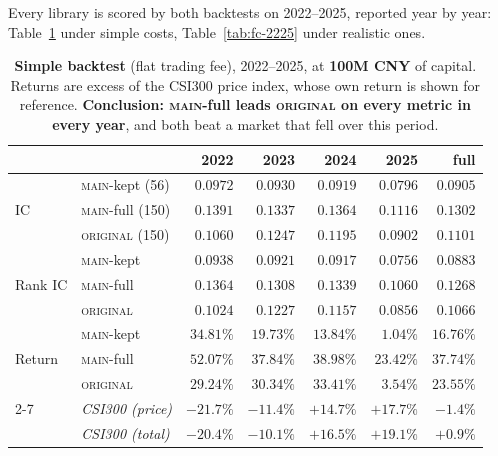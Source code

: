 \documentclass[11pt]{article}
\newcommand{\main}{\textsc{main}}
\newcommand{\orig}{\textsc{original}}
\begin{document}
Every library is scored by both backtests on 2022--2025, reported year by year:
Table~\ref{tab:bt2-2225} under simple costs, Table~\ref{tab:fc-2225} under realistic
ones.

\begin{table}[h]
\centering\small
\setlength{\tabcolsep}{5pt}
\begin{tabular}{llrrrrr}
\toprule
& & 2022 & 2023 & 2024 & 2025 & full \\
\midrule
\multirow{3}{*}{IC}
 & \main{}-kept (56)   & $0.0972$ & $0.0930$ & $0.0919$ & $0.0796$ & $0.0905$ \\
 & \main{}-full (150) & $\bm{0.1391}$ & $\bm{0.1337}$ & $\bm{0.1364}$ & $\bm{0.1116}$ & $\bm{0.1302}$ \\
 & \orig{} (150)      & $0.1060$ & $0.1247$ & $0.1195$ & $0.0902$ & $0.1101$ \\
\midrule
\multirow{3}{*}{Rank IC}
 & \main{}-kept   & $0.0938$ & $0.0921$ & $0.0917$ & $0.0756$ & $0.0883$ \\
 & \main{}-full  & $\bm{0.1364}$ & $\bm{0.1308}$ & $\bm{0.1339}$ & $\bm{0.1060}$ & $\bm{0.1268}$ \\
 & \orig{}       & $0.1024$ & $0.1227$ & $0.1157$ & $0.0856$ & $0.1066$ \\
\midrule
\multirow{3}{*}{Return}
 & \main{}-kept   & $34.81\%$ & $19.73\%$ & $13.84\%$ & $1.04\%$ & $16.76\%$ \\
 & \main{}-full  & $\bm{52.07\%}$ & $\bm{37.84\%}$ & $\bm{38.98\%}$ & $\bm{23.42\%}$ & $\bm{37.74\%}$ \\
 & \orig{}       & $29.24\%$ & $30.34\%$ & $33.41\%$ & $3.54\%$ & $23.55\%$ \\
\cmidrule(l){2-7}
 & \emph{CSI300 (price)} & $-21.7\%$ & $-11.4\%$ & $+14.7\%$ & $+17.7\%$ & $-1.4\%$ \\
 & \emph{CSI300 (total)} & $-20.4\%$ & $-10.1\%$ & $+16.5\%$ & $+19.1\%$ & $+0.9\%$ \\
\bottomrule
\end{tabular}
\caption{\textbf{Simple backtest} (flat trading fee), 2022--2025, at \textbf{100M CNY}
of capital. Returns are excess of the CSI300 price index, whose own return is shown
for reference. \textbf{Conclusion: \main{}-full leads \orig{} on every metric in every
year}, and both beat a market that fell over this period.}
\label{tab:bt2-2225}
\end{table}
\end{document}
